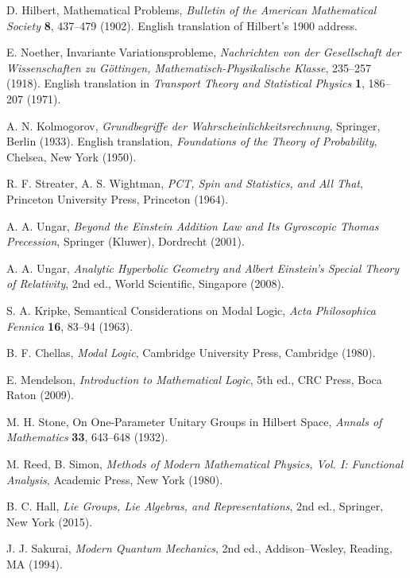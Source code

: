 \documentclass[11pt,a4paper]{article}
\theoremstyle{definition}
\theoremstyle{remark}
\begin{document}
\begin{thebibliography}{99}

D. Hilbert, Mathematical Problems, \textit{Bulletin of the American Mathematical Society} \textbf{8}, 437--479 (1902). English translation of Hilbert's 1900 address.

E. Noether, Invariante Variationsprobleme, \textit{Nachrichten von der Gesellschaft der Wissenschaften zu G\"ottingen, Mathematisch-Physikalische Klasse}, 235--257 (1918). English translation in \textit{Transport Theory and Statistical Physics} \textbf{1}, 186--207 (1971).

A. N. Kolmogorov, \textit{Grundbegriffe der Wahrscheinlichkeitsrechnung}, Springer, Berlin (1933). English translation, \textit{Foundations of the Theory of Probability}, Chelsea, New York (1950).

R. F. Streater, A. S. Wightman, \textit{PCT, Spin and Statistics, and All That}, Princeton University Press, Princeton (1964).

A. A. Ungar, \textit{Beyond the Einstein Addition Law and Its Gyroscopic Thomas Precession}, Springer (Kluwer), Dordrecht (2001).

A. A. Ungar, \textit{Analytic Hyperbolic Geometry and Albert Einstein's Special Theory of Relativity}, 2nd ed., World Scientific, Singapore (2008).

S. A. Kripke, Semantical Considerations on Modal Logic, \textit{Acta Philosophica Fennica} \textbf{16}, 83--94 (1963).

B. F. Chellas, \textit{Modal Logic}, Cambridge University Press, Cambridge (1980).

E. Mendelson, \textit{Introduction to Mathematical Logic}, 5th ed., CRC Press, Boca Raton (2009).

M. H. Stone, On One-Parameter Unitary Groups in Hilbert Space, \textit{Annals of Mathematics} \textbf{33}, 643--648 (1932).

M. Reed, B. Simon, \textit{Methods of Modern Mathematical Physics, Vol. I: Functional Analysis}, Academic Press, New York (1980).

B. C. Hall, \textit{Lie Groups, Lie Algebras, and Representations}, 2nd ed., Springer, New York (2015).

J. J. Sakurai, \textit{Modern Quantum Mechanics}, 2nd ed., Addison--Wesley, Reading, MA (1994).


\end{thebibliography}
\end{document}
